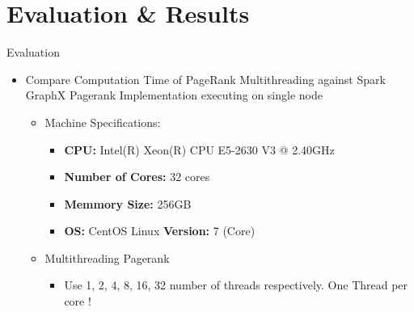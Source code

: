 \documentclass{beamer}
\begin{document}
\section{Evaluation & Results}
\begin{frame}{Evaluation}
    \begin{itemize}
        \item{Compare Computation Time of PageRank Multithreading against Spark
            GraphX Pagerank Implementation executing on single node}
            \begin{itemize} 
                \item{Machine Specifications:}
                    \begin{itemize}
                        \item{\textbf{CPU:} Intel(R) Xeon(R) CPU E5-2630 V3 @ 2.40GHz} 
                        \item{\textbf{Number of Cores:} 32 cores}
                        \item{\textbf{Memmory Size:} 256GB}
                        \item{\textbf{OS:} CentOS Linux \textbf{Version:} 7 (Core)}
                    \end{itemize}

                \item{Multithreading Pagerank}
                    \begin{itemize}
                        \item{Use 1, 2, 4, 8, 16, 32 number of threads
                     respectively. One Thread per core !}
                    \end{itemize}
            \end{itemize}
    \end{itemize}

\end{frame}
\end{document}

